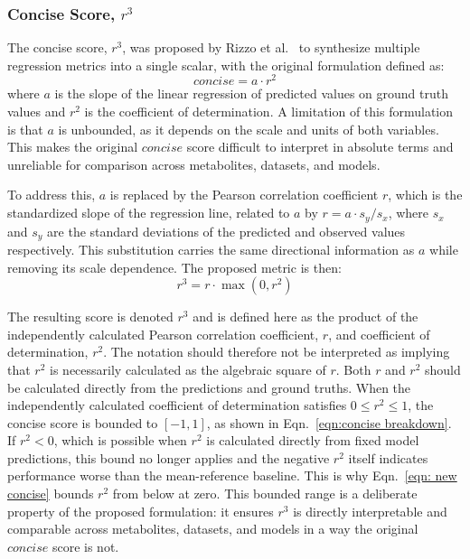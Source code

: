 \subsubsection{Concise Score, $r^3$}\label{sec:Eval:subsec:RegMetrics:subsubsec:concise}
The concise score, $r^3$, was proposed by Rizzo et al.~\cite{Rizzo2023} to synthesize multiple regression metrics into a single scalar, with the original formulation defined as:
\begin{equation}\label{eqn: original concise}
    concise = a \cdot r^2 
\end{equation}
\noindent where $a$ is the slope of the linear regression of predicted values on ground truth values and $r^2$ is the coefficient of determination. A limitation of this formulation is that $a$ is unbounded, as it depends on the scale and units of both variables. This makes the original $concise$ score difficult to interpret in absolute terms and unreliable for comparison across metabolites, datasets, and models.

To address this, $a$ is replaced by the Pearson correlation coefficient $r$, which is the standardized slope of the regression line, related to $a$ by $r = a \cdot s_y/s_x$, where $s_x$ and $s_y$ are the standard deviations of the predicted and observed values respectively. This substitution carries the same directional information as $a$ while removing its scale dependence. The proposed metric is then:
\begin{equation}\label{eqn: new concise}
    r^3 = r \cdot \max(0, r^2) 
\end{equation}

The resulting score is denoted $r^3$ and is defined here as the product of the independently calculated Pearson correlation coefficient, $r$, and coefficient of determination, $r^2$. The notation should therefore not be interpreted as implying that $r^2$ is necessarily calculated as the algebraic square of $r$. Both $r$ and $r^2$ should be calculated directly from the predictions and ground truths. When the independently calculated coefficient of determination satisfies $0 \leq r^2 \leq 1$, the concise score is bounded to $[-1,1]$, as shown in Eqn.~\ref{eqn:concise breakdown}. If $r^2<0$, which is possible when $r^2$ is calculated directly from fixed model predictions, this bound no longer applies and the negative $r^2$ itself indicates performance worse than the mean-reference baseline. This is why Eqn.~\ref{eqn: new concise} bounds $r^2$ from below at zero. This bounded range is a deliberate property of the proposed formulation: it ensures $r^3$ is directly interpretable and comparable across metabolites, datasets, and models in a way the original $concise$ score is not.

